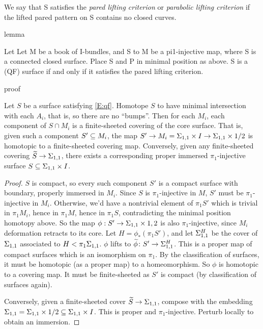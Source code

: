 We say that S satisfies the \emph{pared lifting criterion} or \emph{parabolic
lifting criterion} if the lifted pared pattern on S contains no closed curves.

lemma

Let Let M be a book of I-bundles, and S to M be a pi1-injective map, where S is
a connected closed surface.  Place S and P in minimal position as above. S is
a (QF) surface if and only if it satisfies the pared lifting criterion.

proof



\begin{lemma}\label{L:sc}

Let $S$ be a surface satisfying \eqref{E:qf}. Homotope $S$ to have minimal
intersection with each $A_i$, that is, so there are no ``bumps''.  Then for
each $M_i$, each component of $S \cap M_i$ is a finite-sheeted covering of the
core surface.  That is, given such a component $S' \subseteq M_i$, the map $S' \to
M_i = \Sigma_{1,1}\times I \to \Sigma_{1,1}\times{1/2}$ is homotopic to a finite-sheeted
covering map. Conversely, given any finite-sheeted covering $\widetilde{S} \to
\Sigma_{1,1}$, there exists a corresponding proper immersed $\pi_1$-injective
surface $S \subseteq \Sigma_{1,1}\times I$.

\end{lemma}
\begin{proof}

$S$ is compact, so every such component $S'$ is a compact surface with
boundary, properly immersed in $M_i$. Since $S$ is $\pi_1$-injective in $M$,
$S'$ must be $\pi_1$-injective in $M_i$. Otherwise, we'd have a nontrivial
element of $\pi_1S'$ which is trivial in $\pi_1M_i$, hence in $\pi_1M$, hence
in $\pi_1S$, contradicting the minimal position homotopy above. So the map
$\phi : S'\to\Sigma_{1,1}\times{1,2}$ is also $\pi_1$-injective, since $M_i$
deformation retracts to its core. Let $H = \phi_*(\pi_1S')$, and let
$\Sigma_{1,1}^H$ be the cover of $\Sigma_{1,1}$ associated to $H<\pi_1\Sigma_{1,1}$.
$\phi$ lifts to $\widetilde{\phi}\colon S'\to \Sigma_{1,1}^H$. This is a proper
map of compact surfaces which is an isomorphism on $\pi_1$.  By the
classification of surfaces, it must be homotopic (as a proper map) to
a homeomorphism. So $\phi$ is homotopic to a covering map. It must be
finite-sheeted as $S'$ is compact (by classification of surfaces again).

Conversely, given a finite-sheeted cover $\widetilde{S}\to \Sigma_{1,1}$, compose
with the embedding $\Sigma_{1,1} = \Sigma_{1,1}\times{1/2} \subseteq \Sigma_{1,1}\times I$. This is
proper and $\pi_1$-injective.  Perturb locally to obtain an immersion.

\end{proof}

